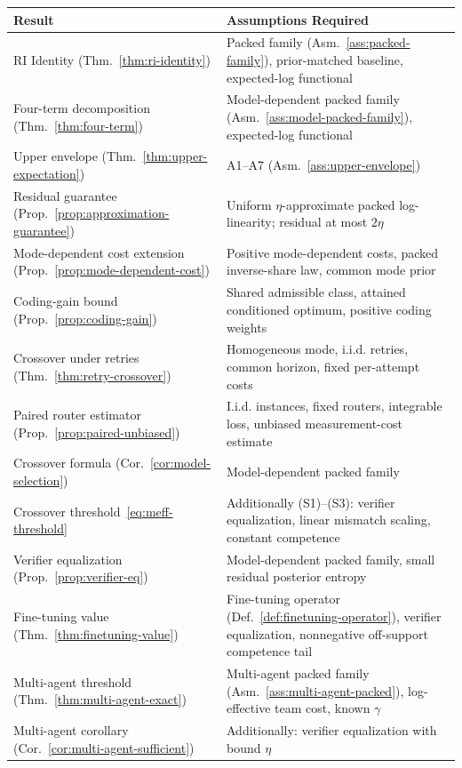 \documentclass[10pt]{article}
\theoremstyle{paperplain}
\theoremstyle{paperdefinition}
\theoremstyle{paperremark}
\begin{document}
\begin{center}
\small
\renewcommand{\arraystretch}{1.2}
\begin{tabular}{@{}lp{7cm}@{}}
\toprule
\textbf{Result} & \textbf{Assumptions Required} \\
\midrule
RI Identity (Thm.~\ref{thm:ri-identity}) & Packed family (Asm.~\ref{ass:packed-family}), prior-matched baseline, expected-log functional \\
Four-term decomposition (Thm.~\ref{thm:four-term}) & Model-dependent packed family (Asm.~\ref{ass:model-packed-family}), expected-log functional \\
Upper envelope (Thm.~\ref{thm:upper-expectation}) & A1--A7 (Asm.~\ref{ass:upper-envelope}) \\
Residual guarantee (Prop.~\ref{prop:approximation-guarantee}) & Uniform $\eta$-approximate packed log-linearity; residual at most $2\eta$ \\
Mode-dependent cost extension (Prop.~\ref{prop:mode-dependent-cost}) & Positive mode-dependent costs, packed inverse-share law, common mode prior \\
Coding-gain bound (Prop.~\ref{prop:coding-gain}) & Shared admissible class, attained conditioned optimum, positive coding weights \\
Crossover under retries (Thm.~\ref{thm:retry-crossover}) & Homogeneous mode, i.i.d. retries, common horizon, fixed per-attempt costs \\
Paired router estimator (Prop.~\ref{prop:paired-unbiased}) & I.i.d. instances, fixed routers, integrable loss, unbiased measurement-cost estimate \\
Crossover formula (Cor.~\ref{cor:model-selection}) & Model-dependent packed family \\
Crossover threshold~\eqref{eq:meff-threshold} & Additionally (S1)--(S3): verifier equalization, linear mismatch scaling, constant competence \\
Verifier equalization (Prop.~\ref{prop:verifier-eq}) & Model-dependent packed family, small residual posterior entropy \\
Fine-tuning value (Thm.~\ref{thm:finetuning-value}) & Fine-tuning operator (Def.~\ref{def:finetuning-operator}), verifier equalization, nonnegative off-support competence tail \\
Multi-agent threshold (Thm.~\ref{thm:multi-agent-exact}) & Multi-agent packed family (Asm.~\ref{ass:multi-agent-packed}), log-effective team cost, known $\gamma$ \\
Multi-agent corollary (Cor.~\ref{cor:multi-agent-sufficient}) & Additionally: verifier equalization with bound $\eta$ \\

\end{tabular}
\end{center}
\end{document}
